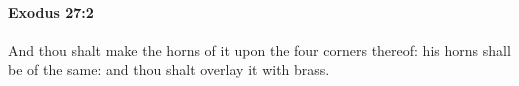 
		\paragraph{Exodus 27:2} %
			\label{EXODUS-27-2}

			And thou shalt make the horns of it upon the four corners thereof: his horns shall be of the same: and thou shalt overlay it with brass.


